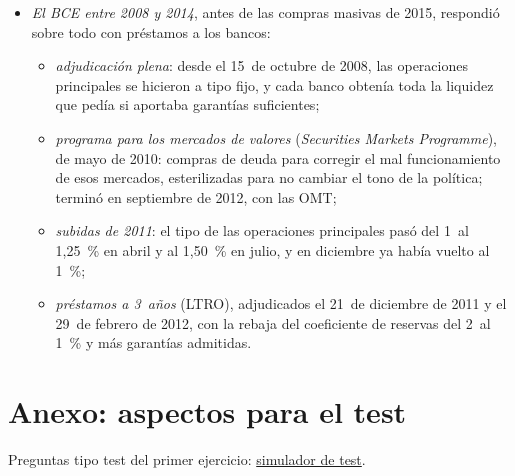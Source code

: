 \documentclass[11pt]{article}
\begin{document}
\begin{itemize}
\item \emph{El BCE entre 2008 y 2014}, antes de las compras masivas de 2015, respondió sobre todo con préstamos a los bancos\nocite{BCE2026Tipos}:
  \begin{itemize}
  \item \emph{adjudicación plena}: desde el 15~de octubre de 2008, las operaciones principales se hicieron a tipo fijo, y cada banco obtenía toda la liquidez que pedía si aportaba garantías suficientes;
  \item \emph{programa para los mercados de valores} (\emph{Securities Markets Programme}), de mayo de 2010: compras de deuda para corregir el mal funcionamiento de esos mercados, esterilizadas para no cambiar el tono de la política; terminó en septiembre de 2012, con las OMT;
  \item \emph{subidas de 2011}: el tipo de las operaciones principales pasó del 1~al 1,25~\% en abril y al 1,50~\% en julio, y en diciembre ya había vuelto al 1~\%;
  \item \emph{préstamos a 3~años} (LTRO), adjudicados el 21~de diciembre de 2011 y el 29~de febrero de 2012, con la rebaja del coeficiente de reservas del 2~al 1~\% y más garantías admitidas.
  \end{itemize}
\end{itemize}

\section{Anexo: aspectos para el test}\label{anexo:test}

\begin{anotaciones}
Preguntas tipo test del primer ejercicio: \href{https://www.victorgutierrezmarcos.es/oposicion/temario/primer-ejercicio/test/simulador.html?tema=3.A.40}{simulador de test}.
\end{anotaciones}
\end{document}
